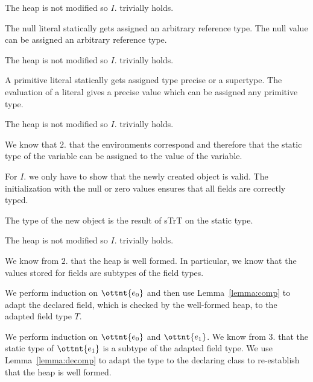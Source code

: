 The heap is not modified so $I.$ trivially holds.

The null literal statically gets assigned an arbitrary reference type.
The null value can be assigned an arbitrary reference type.



The heap is not modified so $I.$ trivially holds.

A primitive literal statically gets assigned type precise or a supertype.
The evaluation of a literal gives a precise value which can be assigned any primitive type.



The heap is not modified so $I.$ trivially holds.

We know that $2.$ that the environments correspond and therefore that the static
type of the variable can be assigned to the value of the variable.



For $I.$ we only have to show that the newly created object is valid.
The initialization with the null or zero values ensures that all fields are correctly typed.

The type of the new object is the result of sTrT on the static type.




The heap is not modified so $I.$ trivially holds.

We know from $2.$ that the heap is well formed.
In particular, we know that the values stored for fields are subtypes
of the field types.

We perform induction on $\ottnt{e_{{\mathrm{0}}}}$ and then use Lemma~\ref{lemma:comp}
to adapt the declared field, which is checked by the well-formed heap,
to the adapted field type $T$.



We perform induction on $\ottnt{e_{{\mathrm{0}}}}$ and $\ottnt{e_{{\mathrm{1}}}}$.
We know from $3.$ that the static type of $\ottnt{e_{{\mathrm{1}}}}$ is a subtype of the
adapted field type.
We use Lemma~\ref{lemma:decomp} to adapt the type to the declaring
class to re-establish that the heap is well formed.


